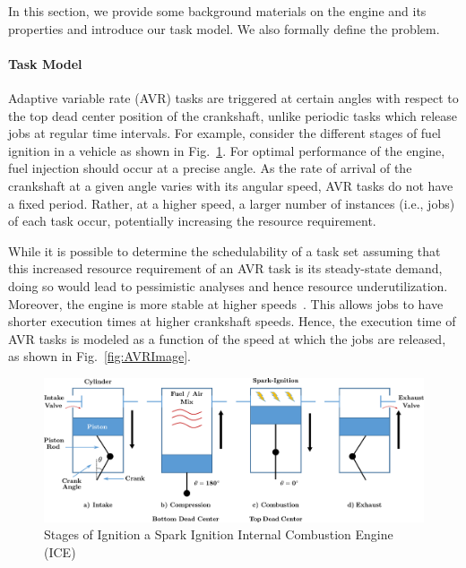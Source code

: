 In this section, we provide some background materials on the engine and its properties and introduce our task model.
We also formally define the problem.
\paragraph{Task Model}
Adaptive variable rate (AVR) tasks are triggered at certain angles with respect to the top dead center position of the crankshaft, unlike periodic tasks which release jobs at regular time intervals.
For example, consider the different stages of fuel ignition in a vehicle as shown in Fig.~\ref{fig:Engine}.
For optimal performance of the engine, fuel injection should occur at a precise angle.
As the rate of arrival of the crankshaft at a given angle varies with its angular speed, AVR tasks do not have a fixed period.
Rather, at a higher speed, a larger number of instances (i.e., jobs) of each task occur, potentially increasing the resource requirement.

While it is possible to determine the schedulability of a task set assuming that this increased resource requirement of an AVR task is its steady-state demand, doing so would lead to pessimistic analyses and hence resource underutilization.
Moreover, the engine is more stable at higher speeds~\cite{dbuttle_real-time_nodate}.
This allows jobs to have shorter execution times at higher crankshaft speeds.
Hence, the execution time of AVR tasks is modeled as a function of the speed at which the jobs are released, as shown in Fig.~\ref{fig:AVRImage}.


\begin{figure}
    \centering
    \includegraphics[width=0.9\linewidth]{fig/vectorEngineIsolated.pdf}
    \caption{Stages of Ignition a Spark Ignition Internal Combustion Engine (ICE)}
    \label{fig:Engine}
\end{figure}

